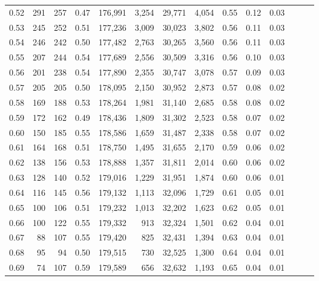 \begin{tabular}{rrrrrrrrrrrrrr}
0.52 &     291 &    257 &  0.47 &  176,991 &    3,254 &  29,771 &   4,054 &  0.55 &  0.12 &      0.03 \\
0.53 &     245 &    252 &  0.51 &  177,236 &    3,009 &  30,023 &   3,802 &  0.56 &  0.11 &      0.03 \\
0.54 &     246 &    242 &  0.50 &  177,482 &    2,763 &  30,265 &   3,560 &  0.56 &  0.11 &      0.03 \\
0.55 &     207 &    244 &  0.54 &  177,689 &    2,556 &  30,509 &   3,316 &  0.56 &  0.10 &      0.03 \\
0.56 &     201 &    238 &  0.54 &  177,890 &    2,355 &  30,747 &   3,078 &  0.57 &  0.09 &      0.03 \\
0.57 &     205 &    205 &  0.50 &  178,095 &    2,150 &  30,952 &   2,873 &  0.57 &  0.08 &      0.02 \\
0.58 &     169 &    188 &  0.53 &  178,264 &    1,981 &  31,140 &   2,685 &  0.58 &  0.08 &      0.02 \\
0.59 &     172 &    162 &  0.49 &  178,436 &    1,809 &  31,302 &   2,523 &  0.58 &  0.07 &      0.02 \\
0.60 &     150 &    185 &  0.55 &  178,586 &    1,659 &  31,487 &   2,338 &  0.58 &  0.07 &      0.02 \\
0.61 &     164 &    168 &  0.51 &  178,750 &    1,495 &  31,655 &   2,170 &  0.59 &  0.06 &      0.02 \\
0.62 &     138 &    156 &  0.53 &  178,888 &    1,357 &  31,811 &   2,014 &  0.60 &  0.06 &      0.02 \\
0.63 &     128 &    140 &  0.52 &  179,016 &    1,229 &  31,951 &   1,874 &  0.60 &  0.06 &      0.01 \\
0.64 &     116 &    145 &  0.56 &  179,132 &    1,113 &  32,096 &   1,729 &  0.61 &  0.05 &      0.01 \\
0.65 &     100 &    106 &  0.51 &  179,232 &    1,013 &  32,202 &   1,623 &  0.62 &  0.05 &      0.01 \\
0.66 &     100 &    122 &  0.55 &  179,332 &      913 &  32,324 &   1,501 &  0.62 &  0.04 &      0.01 \\
0.67 &      88 &    107 &  0.55 &  179,420 &      825 &  32,431 &   1,394 &  0.63 &  0.04 &      0.01 \\
0.68 &      95 &     94 &  0.50 &  179,515 &      730 &  32,525 &   1,300 &  0.64 &  0.04 &      0.01 \\
0.69 &      74 &    107 &  0.59 &  179,589 &      656 &  32,632 &   1,193 &  0.65 &  0.04 &      0.01 \\

\end{tabular}

